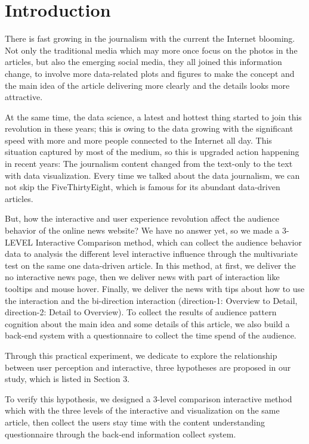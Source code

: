 \documentclass[9pt,journal,compsoc]{IEEEtran}
\begin{document}
\section{Introduction}
\large
There is fast growing in the journalism with the current the Internet blooming. Not only the traditional media which may more once focus on the photos in the articles, but also the emerging social media, they all joined this information change, to involve more data-related plots and figures to make the concept and the main idea of the article delivering more clearly and the details looks more attractive.

At the same time, the data science, a latest and hottest thing started to join this revolution in these years; this is owing to the data growing with the significant speed with more and more people connected to the Internet all day. This situation captured by most of the medium, so this is upgraded action happening in recent years: The journalism content changed from the text-only to the text with data visualization. Every time we talked about the data journalism, we can not skip the FiveThirtyEight, which is famous for its abundant data-driven articles.

But, how the interactive and user experience revolution affect the audience behavior of the online news website? We have no answer yet, so we made a 3-LEVEL Interactive Comparison method, which can collect the audience behavior data to analysis the different level interactive influence through the multivariate test on the same one data-driven article. In this method, at first, we deliver the no interactive news page, then we deliver news with part of interaction like tooltips and mouse hover. Finally, we deliver the news with tips about how to use the interaction and the bi-direction interaction (direction-1: Overview to Detail, direction-2: Detail to Overview). To collect the results of audience pattern cognition about the main idea and some details of this article, we also build a back-end system with a questionnaire to collect the time spend of the audience.

Through this practical experiment, we dedicate to explore the relationship between user perception and interactive, three hypotheses are proposed in our study, which is listed in Section 3.

 To verify this hypothesis, we designed a 3-level comparison interactive method which with the three levels of the interactive and visualization on the same article, then collect the users stay time with the content understanding questionnaire through the back-end information collect system. 
\end{document}
